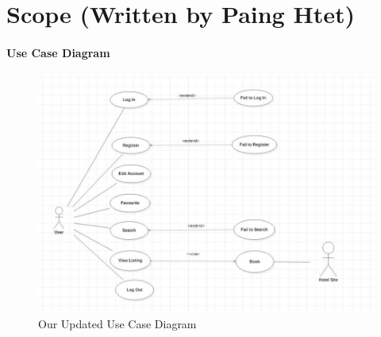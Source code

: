 \documentclass[]{article}
\begin{document}
\section{Scope (Written by Paing Htet)}
\paragraph{Use Case Diagram}
\begin{figure}[H]
    \centering
    \includegraphics[scale=0.4]{usecase.png}
    \caption{Our Updated Use Case Diagram}
\end{figure}
\end{document}
